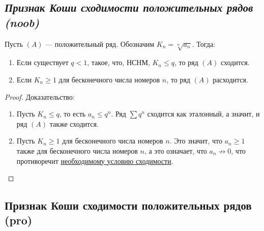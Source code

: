 \subsection{\itshape Признак Коши сходимости положительных рядов (noob)} \hypertarget{Коши-нуб}{}

\begin{theorem}
	Пусть \((A)\) --- положительный ряд. Обозначим \(K_n = \sqrt[n]{a_n}\). Тогда:
	\begin{enumerate}
		\item Если существует \(q < 1\), такое, что, НСНМ, \(K_n \leqslant q\), то ряд \((A)\) сходится.
		\item Если \(K_n \geqslant 1\) для бесконечного числа номеров \(n\), то ряд \((A)\) расходится.
	\end{enumerate}
\end{theorem}
\begin{proof}
	Доказательство:
	\begin{enumerate}
		\item Пусть  \(K_n \leqslant q\), то есть \(a_n \leqslant q^n\). Ряд \(\sum q^n\) сходится как эталонный, а значит, и ряд \((A)\) также сходится.
		\item Пусть \(K_n \geqslant 1\) для бесконечного числа номеров \(n\). Это значит, что \(a_n \geqslant 1\) также для бесконечного числа номеров \(n\), а это означает, что \(a_n \not\to 0\), что противоречит \hyperlink{необходимое условие сходимости}{необходимому условию сходимости}.
	\end{enumerate}
\end{proof}

\subsection{Признак Коши сходимости положительных рядов (pro)} \hypertarget{Коши-про}{}


